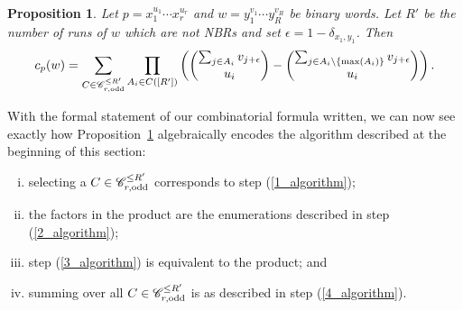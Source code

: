 \documentclass[11pt]{amsart}
\newtheorem{prop}[theorem]{Proposition}
\begin{document}
\begin{prop}\label{combinatorial_formula_for_number_of_occurrences}
    Let $p=x_1^{u_1}\cdots x_r^{u_r}$ and $w=y_1^{v_1}\cdots y_{R}^{v_R}$ be binary words. Let $R'$ be the number of runs of $w$ which are not NBRs and set $\epsilon=1-\delta_{x_1,y_1}$. Then
    \begin{align}\label{eqn_comb_formula}
        c_p(w)=\sum_{C\in\mathscr{C}_{r,\text{\normalfont odd}}^{\leq R'}}\prod_{A_i\in C([R'])}\left({\sum_{j\in A_i}v_{j+\epsilon}\choose u_i}-{\sum_{j\in A_i\setminus\{\max(A_i)\}}v_{j+\epsilon}\choose u_i}\right).
    \end{align}
\end{prop}

With the formal statement of our combinatorial formula written, we can now see exactly how Proposition~\ref{combinatorial_formula_for_number_of_occurrences} algebraically encodes the algorithm described at the beginning of this section:
\begin{enumerate}[(i)]
    \item selecting a $C\in\mathscr{C}_{r,\text{\normalfont odd}}^{\leq R'}$ corresponds to step (\ref{1_algorithm});
    \item the factors in the product are the enumerations described in step (\ref{2_algorithm});
    \item step (\ref{3_algorithm}) is equivalent to the product; and
    \item summing over all $C\in\mathscr{C}_{r,\text{\normalfont odd}}^{\leq R'}$ is as described in step (\ref{4_algorithm}).
\end{enumerate}
\end{document}
